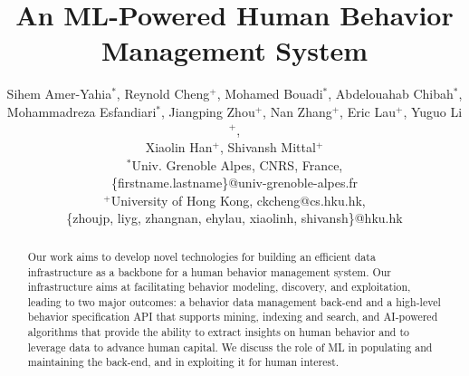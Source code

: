 \documentclass[11pt]{article}
\begin{document}
\title{An ML-Powered Human Behavior Management System}
\author{Sihem Amer-Yahia$^*$, Reynold Cheng$^+$, Mohamed Bouadi$^*$,
Abdelouahab Chibah$^*$,\\ Mohammadreza Esfandiari$^*$, 
Jiangping Zhou$^+$, Nan Zhang$^+$, Eric Lau$^+$, Yuguo Li$^+$,\\
Xiaolin Han$^+$, Shivansh Mittal$^+$\\
$^*$Univ. Grenoble Alpes, CNRS, France,\\ \{firstname.lastname\}@univ-grenoble-alpes.fr\\ $^+$University of Hong Kong, ckcheng@cs.hku.hk,\\
\{zhoujp, liyg, zhangnan,
ehylau, xiaolinh, shivansh\}@hku.hk
}
\maketitle

\date{}


\begin{abstract}
Our work aims to develop novel technologies for building an efficient data infrastructure as a backbone for a human behavior management system. Our infrastructure aims at facilitating behavior modeling, discovery, and exploitation, leading to two major outcomes: a behavior data management back-end and a high-level behavior specification API that supports mining, indexing and search, and AI-powered algorithms that provide the ability to extract insights on human behavior and to leverage data to advance human capital. We discuss the role of ML in populating and maintaining the back-end, and in exploiting it for human interest. 
\end{abstract}
\end{document}
